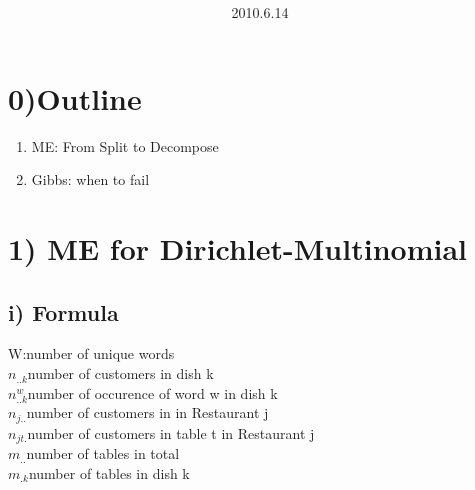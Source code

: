 \documentclass{article}
\title{\vspace{0.3in}\textmd{\textbf{\hmwkTitle}}}
\date{2010.6.14}
\author{\textbf{\hmwkAuthorName}}
\begin{document}
\begin{spacing}{1.1}
\maketitle

\section{0)Outline}
\begin{enumerate}
\item ME: From Split to Decompose
\item Gibbs: when to fail
\end{enumerate}


\section{1) ME for Dirichlet-Multinomial}
\subsection{i) Formula}
W:number of unique words\\ 
$n_{..k}$number of customers in dish k \\
$n_{..k}^{w}$number of occurence of word w in dish k \\
$n_{j..}$number of customers in in Restaurant j \\
$n_{jt.}$number of customers in table t in Restaurant j \\
$m_{..}$number of tables in total \\
$m_{.k}$number of tables in dish k \\


\end{spacing}
\end{document}
